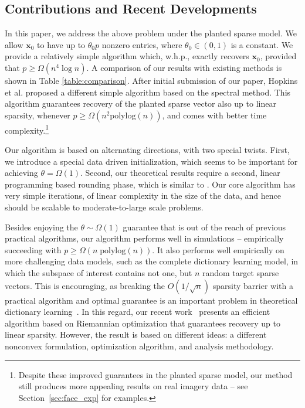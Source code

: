 \documentclass[11pt, journal, final]{IEEEtran}
\numberwithin{equation}{section}
\newcommand{\mb}{\mathbf}
\newcommand{ \paren }[1]{ \left( #1 \right) }
\begin{document}
{\subsection{Contributions and Recent Developments}
In this paper, we address the above problem under the planted sparse model. We allow $\mb x_0$ to have up to $\theta_0 p$ nonzero entries, where $\theta_0 \in \paren{0, 1}$ is a constant. We provide a relatively simple algorithm which, w.h.p., exactly recovers $\mb x_0$, provided that $p \ge \Omega\paren{ n^4 \log n}$. A comparison of our results with existing methods is shown in Table \ref{table:comparison}. After initial submission of our paper, Hopkins et al. \cite{hopkins2015speeding} proposed a different simple algorithm based on the spectral method. This algorithm guarantees recovery of the planted sparse vector also up to linear sparsity, whenever $p \ge \Omega(n^2 \mathrm{polylog} (n))$, and comes with better time complexity.\footnote{Despite these improved guarantees in the planted sparse model, our method still produces more appealing results on real imagery data -- see Section~\ref{sec:face_exp} for examples. }

Our algorithm is based on alternating directions, with two special twists. First, we introduce a special data driven initialization, which seems to be important for achieving $\theta = \Omega(1)$. Second, our theoretical results require a second, linear programming based rounding phase, which is similar to \cite{spielman2013exact}.  Our core algorithm has very simple iterations, of linear complexity in the size of the data, and hence should be scalable to moderate-to-large scale problems.

Besides enjoying the $\theta \sim \Omega(1)$ guarantee that is out of the reach of previous practical algorithms, our algorithm performs well in simulations -- empirically succeeding  with $p \geq \Omega\paren{n \; \mathrm{polylog}(n)}$. It also performs well empirically on more challenging data models, such as the complete dictionary learning model, in which the subspace of interest contains not one, but $n$ random target sparse vectors. This is encouraging, as breaking the $O(1/\sqrt{n})$ sparsity barrier with a practical algorithm and optimal guarantee is an important problem in theoretical dictionary learning~\cite{arora2013new,agarwal2013exact, agarwal2013learning,arora2014more,arora2015simple}. In this regard, our recent work~\cite{sun2015complete} presents an efficient algorithm based on Riemannian optimization that guarantees recovery up to linear sparsity. However, the result is based on different ideas: a different nonconvex formulation, optimization algorithm, and analysis methodology.

}
\end{document}
